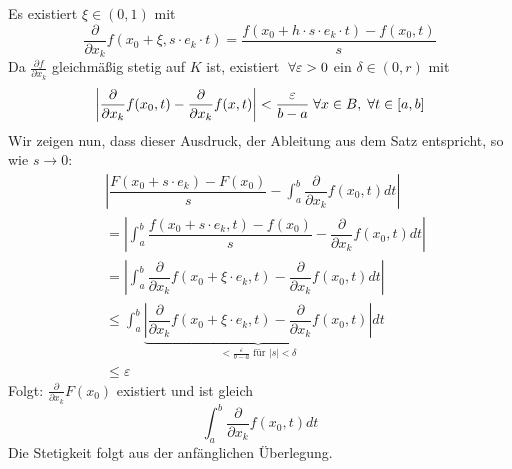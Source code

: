 \documentclass[main.tex]{subfiles}
\begin{document}
\begin{Beweis}
  Es existiert $\xi \in (0,1)$ mit
  $$\dfrac{\partial}{\partial x_k} f(x_0 + \xi, s \cdot e_k \cdot t) = \dfrac{f(x_0 + h \cdot s \cdot e_k \cdot t) - f(x_0, t)}{s}$$
  Da $\frac{\partial f}{\partial x_k}$ gleichmäßig stetig auf $K$ ist, existiert $\;\forall \varepsilon > 0$ ein $\delta \in (0,r)$ mit
  $$\left| \dfrac{\partial}{\partial x_k} f(x_0, t) - \dfrac{\partial}{\partial x_k} f(x,t) \right| < \dfrac{\varepsilon}{b-a} \;\forall x \in B, \;\forall t \in [a,b]$$
  Wir zeigen nun, dass dieser Ausdruck, der Ableitung aus dem Satz entspricht, so wie $s \to 0$:
  $$\begin{aligned}
    & \left| \dfrac{F(x_0 + s\cdot e_k) - F(x_0)}{s} - \int_a^b \dfrac{\partial}{\partial x_k} f(x_0, t) dt \right| \\
    & = \left|\int_a^b \dfrac{f(x_0 + s \cdot e_k, t) - f(x_0)}{s} - \dfrac{\partial}{\partial x_k} f(x_0, t) dt \right| \\
    & = \left| \int_a^b \dfrac{\partial}{\partial x_k} f(x_0 + \xi \cdot e_k, t) - \dfrac{\partial}{\partial x_k} f(x_0,t) dt \right| \\
    & \leq \int_a^b \underbrace{\left| \dfrac{\partial}{\partial x_k} f(x_0 + \xi \cdot e_k, t) - \dfrac{\partial}{\partial x_k} f(x_0,t) \right|}_{< \frac{\varepsilon}{b-a} \text{ für } |s| < \delta} dt \\
    & \leq \varepsilon
  \end{aligned}$$
  Folgt: $\frac{\partial}{\partial x_k} F(x_0)$ existiert und ist gleich
  $$\int_a^b \dfrac{\partial}{\partial x_k} f(x_0, t) dt$$
  Die Stetigkeit folgt aus der anfänglichen Überlegung.
\end{Beweis}
\end{document}
